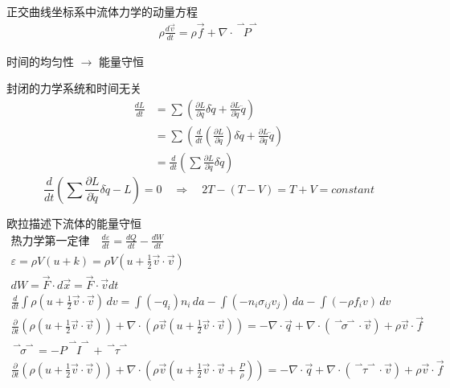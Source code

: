 \documentclass[12pt, a4paper, oneside, UTF8]{ctexbook}  %
\newcommand{\pa}{\partial}
\newcommand{\vvec}{\overset{\rightharpoonup\!\!\!\! \rightharpoonup}}
\begin{document}
\begin{corollary}
    正交曲线坐标系中流体力学的动量方程
    \begin{align*}
            \rho\frac{d\vec{v}}{dt}=\rho\vec{f}+\nabla\cdot\vvec{P}
    \end{align*}
\end{corollary}
\begin{thm}
    时间的均匀性 $\rightarrow$ 能量守恒

    封闭的力学系统和时间无关
    \begin{align*}
        \frac{dL}{dt}&=\sum\left(\frac{\pa L}{\pa q}\delta\dot{q}
        +\frac{\pa L}{\pa \dot{q}}\ddot{q}\right)\\
        &=\sum\left(\frac{d}{dt}\left(\frac{\pa L}{\pa \dot{q}}\right)\delta\dot{q}
        +\frac{\pa L}{\pa \dot{q}}\ddot{q}\right)\\
        &=\frac{d}{dt}\left(\sum\frac{\pa L}{\pa \dot{q}}\delta\dot{q}\right)
    \end{align*}
    \[
        \frac{d}{dt}\left(\sum\frac{\pa L}{\pa \dot{q}}\delta\dot{q}-L\right)=0
        \quad\Rightarrow\quad
        2T-(T-V)=T+V=constant
    \]
\end{thm}
\begin{example}
    欧拉描述下流体的能量守恒
\begin{gather*}
        \text{热力学第一定律}\quad
        \frac{d\varepsilon}{dt}=\frac{dQ}{dt}-\frac{dW}{dt}\\
        \varepsilon=\rho V(u+k)=\rho V(u+\frac{1}{2}\vec{v}\cdot\vec{v})\\
        dW=\vec{F}\cdot d\vec{x}=\vec{F}\cdot \vec{v}dt\\
        \frac{d}{dt}\int \rho(u+\frac{1}{2}\vec{v}\cdot\vec{v})\,dv=\int(-q_i)n_i\,da
        -\int (-n_i\sigma_{ij}v_j)\,da-\int(-\rho f_i v)\,dv\\
        \frac{\pa}{\pa t}\left(\rho(u+\frac{1}{2}\vec{v}\cdot\vec{v})\right)+
        \nabla\cdot\left(\rho\vec{v}(u+\frac{1}{2}\vec{v}\cdot\vec{v})\right)=
        -\nabla\cdot\vec{q}+\nabla\cdot(\vvec{\sigma}\cdot\vec{v})+\rho\vec{v}\cdot\vec{f}\\
        \vvec{\sigma}=-P\vvec{I}+\vvec{\tau}\\
        \frac{\pa}{\pa t}\left(\rho(u+\frac{1}{2}\vec{v}\cdot\vec{v})\right)+
        \nabla\cdot\left(\rho\vec{v}(u+\frac{1}{2}\vec{v}\cdot\vec{v}+\frac{P}{\rho})\right)=
        -\nabla\cdot\vec{q}+\nabla\cdot(\vvec{\tau}\cdot\vec{v})+\rho\vec{v}\cdot\vec{f}
\end{gather*}
\end{example}










\ifx\allfiles\undefined
\end{document}
